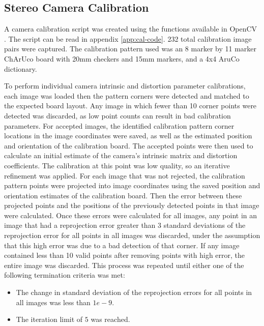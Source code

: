 \subsection{Stereo Camera Calibration} \label{sec:methods:calibration}

A camera calibration script was created using the functions available in OpenCV \cite{bradski_opencv_2000}. The script can be read in appendix \ref{app:cal-code}.
232 total calibration image pairs were captured. The calibration pattern used was an 8 marker by 11 marker ChArUco board with 20mm checkers and 15mm markers, and a 4x4 AruCo dictionary.

To perform individual camera intrinsic and distortion parameter calibrations, each image was loaded then the pattern corners were detected and matched to the expected board layout.
Any image in which fewer than 10 corner points were detected was discarded, as low point counts can result in bad calibration parameters. For accepted images, the identified calibration
pattern corner locations in the image coordinates were saved, as well as the estimated position and orientation of the calibration board. The accepted points were then used to calculate 
an initial estimate of the camera's intrinsic matrix and distortion coefficients. The calibration at this point was low quality, so an iterative refinement was applied. For each image
that was not rejected, the calibration pattern points were projected into image coordinates using the saved position and orientation estimates of the calibration board. Then the error between these 
projected points and the positions of the previously detected points in that image were calculated. Once these errors were calculated for all images, any point in an image that had a reprojection error 
greater than 3 standard deviations of the reprojection error for all points in all images was discarded, under the assumption that this high error was due to a bad detection of that corner. If any image 
contained less than 10 valid points after removing points with high error, the entire image was discarded. This process was repeated until either one of the following termination criteria was met:

\begin{itemize}
    \item The change in standard deviation of the reprojection errors for all points in all images was less than $1e-9$.
    \item The iteration limit of $5$ was reached.
\end{itemize}


